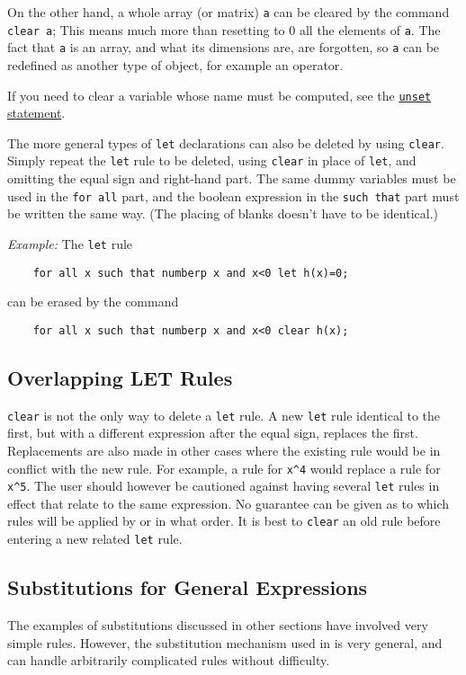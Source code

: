 On the other hand, a whole array (or matrix) \texttt{a} can be cleared by the
command \texttt{clear a};  This means much more than resetting to 0 all the
elements of \texttt{a}.  The fact that \texttt{a} is an array, and what its
dimensions are, are forgotten, so \texttt{a} can be redefined as another type
of object, for example an operator.

If you need to clear a variable whose name must be computed, see the
\hyperlink{command:UNSET}{\texttt{unset} statement}.

The more general types of \texttt{let} declarations can also be deleted by
using \texttt{clear}.  Simply repeat the \texttt{let} rule to be deleted, using
\texttt{clear} in place of \texttt{let}, and omitting the equal sign and
right-hand part.  The same dummy variables must be used in the
\texttt{for all} part, and the boolean expression in the \texttt{such that} part must be
written the same way. (The placing of blanks doesn't have to be
identical.)

\textit{Example:} The \texttt{let} rule
\begin{verbatim}
    for all x such that numberp x and x<0 let h(x)=0;
\end{verbatim}
can be erased by the command
\begin{verbatim}
    for all x such that numberp x and x<0 clear h(x);
\end{verbatim}

\subsection{Overlapping LET Rules}
\texttt{clear} is not the only way to delete a \texttt{let} rule.  A new 
\texttt{let} rule identical to the first, but with a different expression after
the equal sign, replaces the first.  Replacements are also made in other
cases where the existing rule would be in conflict with the new rule.  For
example, a rule for \texttt{x\textasciicircum 4} would replace a rule for 
\texttt{x\textasciicircum 5}.
The user should however be cautioned against having several \texttt{let}
rules in effect that relate to the same expression.  No guarantee can be
given as to which rules will be applied by {\REDUCE} or in what order.  It
is best to \texttt{clear} an old rule before entering a new related 
\texttt{let} rule.

\subsection{Substitutions for General Expressions}
\label{sec-gensubs}
The examples of substitutions discussed in other sections have involved
very simple rules. However, the substitution mechanism used in {\REDUCE} is
very general, and can handle arbitrarily complicated rules without
difficulty.

